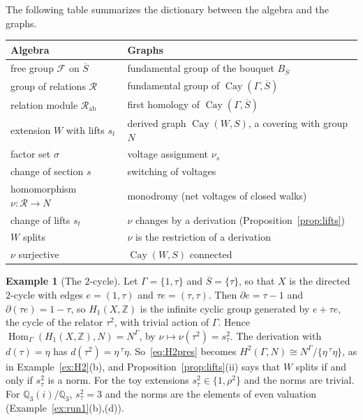 \documentclass[12pt,letterpaper]{article}
\numberwithin{equation}{section}
\theoremstyle{plain}
\theoremstyle{definition}
\newtheorem{example}[theorem]{Example}
\newcommand{\Z}{\mathbb{Z}}
\newcommand{\Q}{\mathbb{Q}}
\newcommand{\act}[2]{{}^{#1}\!#2}          %
\newcommand{\fr}{\mathcal{F}}             %
\newcommand{\rel}{\mathcal{R}}            %
\DeclareMathOperator{\Hom}{Hom}
\DeclareMathOperator{\Cay}{Cay}
\begin{document}
The following table summarizes the dictionary between the algebra and the
graphs.
\begin{center}
\begin{tabular}{@{}p{}p{}@{}}
\toprule
Algebra & Graphs \\
\midrule
free group $\fr$ on $\overline{S}$ & fundamental group of the bouquet
$B_{\overline{S}}$ \\
group of relations $\rel$ & fundamental group of
$\Cay(\Gamma,\overline{S})$ \\
relation module $\rel_{\mathrm{ab}}$ & first homology of
$\Cay(\Gamma,\overline{S})$ \\
extension $W$ with lifts $s_t$ & derived graph $\Cay(W,S)$, a covering
with group $N$ \\
factor set $\sigma$ & voltage assignment $\nu_s$ \\
change of section $s$ & switching of voltages \\
homomorphism $\nu:\rel\to N$ & monodromy (net voltages of closed walks) \\
change of lifts $s_t$ & $\nu$ changes by a derivation
(Proposition~\ref{prop:lifts}) \\
$W$ splits & $\nu$ is the restriction of a derivation \\
$\nu$ surjective & $\Cay(W,S)$ connected \\
\bottomrule
\end{tabular}
\end{center}

\begin{example}[The $2$-cycle]\label{ex:twocycle}
Let $\Gamma=\{1,\tau\}$ and $\overline{S}=\{\tau\}$, so that $X$ is the
directed $2$-cycle with edges $e=(1,\tau)$ and $\tau e=(\tau,\tau)$. Then
$\partial e=\tau-1$ and $\partial(\tau e)=1-\tau$, so $H_1(X,\Z)$ is the
infinite cyclic group generated by $e+\tau e$, the cycle of the relator
$\tau^2$, with trivial action of $\Gamma$. Hence
$\Hom_\Gamma(H_1(X,\Z),N)=N^\Gamma$, by $\nu\mapsto\nu(\tau^2)=s_\tau^2$.
The derivation with $d(\tau)=\eta$ has
$d(\tau^2)=\eta\,\act{\tau}{\eta}$. So~\eqref{eq:H2pres} becomes
$H^2(\Gamma,N)\cong N^\Gamma/\{\eta\,\act{\tau}{\eta}\}$, as in
Example~\ref{ex:H2}(b), and Proposition~\ref{prop:lifts}(ii) says that $W$
splits if and only if $s_\tau^2$ is a norm. For the toy extensions
$s_\tau^2\in\{1,\rho^2\}$ and the norms are trivial. For $\Q_3(i)/\Q_3$,
$s_\tau^2=3$ and the norms are the elements of even valuation
(Example~\ref{ex:run1}(b),(d)).
\end{example}
\end{document}
